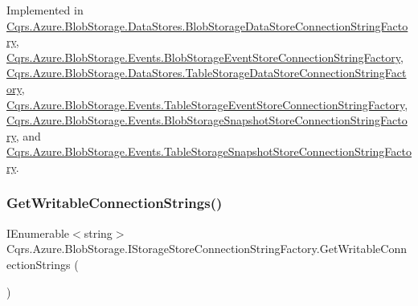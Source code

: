 Implemented in \hyperlink{classCqrs_1_1Azure_1_1BlobStorage_1_1DataStores_1_1BlobStorageDataStoreConnectionStringFactory_a1b5b69109d07e5612df981012d812e78_a1b5b69109d07e5612df981012d812e78}{Cqrs.\+Azure.\+Blob\+Storage.\+Data\+Stores.\+Blob\+Storage\+Data\+Store\+Connection\+String\+Factory}, \hyperlink{classCqrs_1_1Azure_1_1BlobStorage_1_1Events_1_1BlobStorageEventStoreConnectionStringFactory_aa47606e4cd5a71437bed71e07fda53ed_aa47606e4cd5a71437bed71e07fda53ed}{Cqrs.\+Azure.\+Blob\+Storage.\+Events.\+Blob\+Storage\+Event\+Store\+Connection\+String\+Factory}, \hyperlink{classCqrs_1_1Azure_1_1BlobStorage_1_1DataStores_1_1TableStorageDataStoreConnectionStringFactory_a0bdcd6f6d273a225c3ebcd6aa9386b95_a0bdcd6f6d273a225c3ebcd6aa9386b95}{Cqrs.\+Azure.\+Blob\+Storage.\+Data\+Stores.\+Table\+Storage\+Data\+Store\+Connection\+String\+Factory}, \hyperlink{classCqrs_1_1Azure_1_1BlobStorage_1_1Events_1_1TableStorageEventStoreConnectionStringFactory_a047e58aa30e97231dc913df350bc2446_a047e58aa30e97231dc913df350bc2446}{Cqrs.\+Azure.\+Blob\+Storage.\+Events.\+Table\+Storage\+Event\+Store\+Connection\+String\+Factory}, \hyperlink{classCqrs_1_1Azure_1_1BlobStorage_1_1Events_1_1BlobStorageSnapshotStoreConnectionStringFactory_ab226acce237117b81f7ea577b2190697_ab226acce237117b81f7ea577b2190697}{Cqrs.\+Azure.\+Blob\+Storage.\+Events.\+Blob\+Storage\+Snapshot\+Store\+Connection\+String\+Factory}, and \hyperlink{classCqrs_1_1Azure_1_1BlobStorage_1_1Events_1_1TableStorageSnapshotStoreConnectionStringFactory_a092e6f4132d8cb0c1b25e0c19a3911ba_a092e6f4132d8cb0c1b25e0c19a3911ba}{Cqrs.\+Azure.\+Blob\+Storage.\+Events.\+Table\+Storage\+Snapshot\+Store\+Connection\+String\+Factory}.

\mbox{\label{interfaceCqrs_1_1Azure_1_1BlobStorage_1_1IStorageStoreConnectionStringFactory_a26ecfd0805fe3d525e9fa419330bd140_a26ecfd0805fe3d525e9fa419330bd140}} 
\subsubsection{\texorpdfstring{Get\+Writable\+Connection\+Strings()}{GetWritableConnectionStrings()}}
{\footnotesize\ttfamily I\+Enumerable$<$string$>$ Cqrs.\+Azure.\+Blob\+Storage.\+I\+Storage\+Store\+Connection\+String\+Factory.\+Get\+Writable\+Connection\+Strings (\begin{DoxyParamCaption}{ }\end{DoxyParamCaption})}



